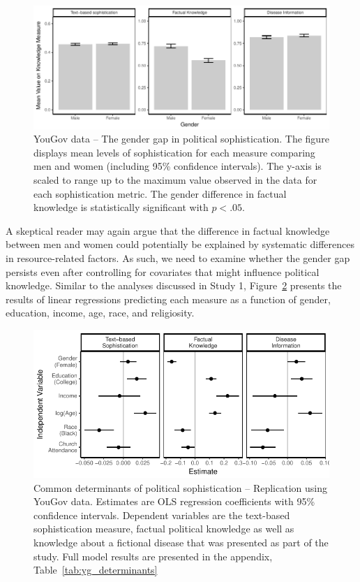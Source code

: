 \documentclass[12pt]{article}
\begin{document}
\begin{figure}[h]\centering
\includegraphics{../fig/yg_meandiff.pdf}
\caption{YouGov data -- The gender gap in political sophistication. The figure displays mean levels of sophistication for each measure comparing men and women (including 95\% confidence intervals). The y-axis is scaled to range up to the maximum value observed in the data for each sophistication metric. The gender difference in factual knowledge is statistically significant with $p<.05$.}\label{fig:yg_meandiff}
\end{figure}

A skeptical reader may again argue that the difference in factual knowledge between men and women could potentially be explained by systematic differences in resource-related factors. As such, we need to examine whether the gender gap persists even after controlling for covariates that might influence political knowledge. Similar to the analyses discussed in Study 1, Figure~\ref{fig:yg_determinants} presents the results of linear regressions predicting each measure as a function of gender, education, income, age, race, and religiosity.

\begin{figure}[h]\centering
\includegraphics{../fig/yg_determinants.pdf}
\caption{Common determinants of political sophistication -- Replication using YouGov data. Estimates are OLS regression coefficients with 95\% confidence intervals. Dependent variables are the text-based sophistication measure, factual political knowledge as well as knowledge about a fictional disease that was presented as part of the study. Full model results are presented in the appendix, Table~\ref{tab:yg_determinants}}\label{fig:yg_determinants}
\end{figure}
\end{document}

